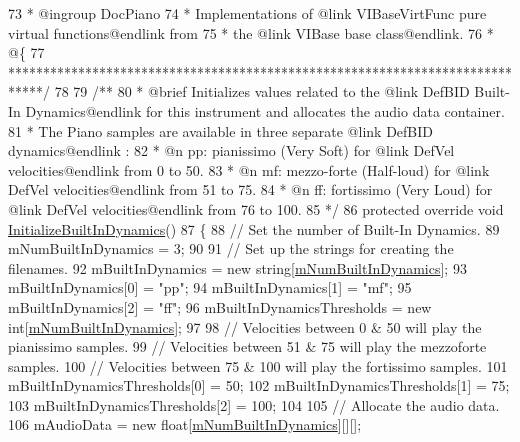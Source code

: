 \begin{DoxyCodeInclude}
73 \textcolor{comment}{     * @ingroup DocPiano}
74 \textcolor{comment}{     * Implementations of @link VIBaseVirtFunc pure virtual functions@endlink from}
75 \textcolor{comment}{     * the @link VIBase base class@endlink. }
76 \textcolor{comment}{     * @\{}
77 \textcolor{comment}{    *****************************************************************************/}
78 \textcolor{comment}{}
79 \textcolor{comment}{    /**}
80 \textcolor{comment}{     * @brief Initializes values related to the @link DefBID Built-In Dynamics@endlink for this instrument
       and allocates the audio data container.}
81 \textcolor{comment}{     * The Piano samples are available in three separate @link DefBID dynamics@endlink :}
82 \textcolor{comment}{     * @n pp: pianissimo (Very Soft) for @link DefVel velocities@endlink from 0 to 50.}
83 \textcolor{comment}{     * @n mf: mezzo-forte (Half-loud) for @link DefVel velocities@endlink from 51 to 75.}
84 \textcolor{comment}{     * @n ff: fortissimo (Very Loud) for @link DefVel velocities@endlink from 76 to 100.}
85 \textcolor{comment}{    */} 
86     \textcolor{keyword}{protected} \textcolor{keyword}{override} \textcolor{keywordtype}{void} \hyperlink{group___piano_virt_func_ga6bc02528f8808b8a30aa7d5776445a6d}{InitializeBuiltInDynamics}()
87     \{
88         \textcolor{comment}{// Set the number of Built-In Dynamics.}
89         mNumBuiltInDynamics = 3;
90 
91         \textcolor{comment}{// Set up the strings for creating the filenames.}
92         mBuiltInDynamics = \textcolor{keyword}{new} \textcolor{keywordtype}{string}[\hyperlink{group___v_i_base_pro_var_gac265f64f759d267ee1e1680f8d387011}{mNumBuiltInDynamics}];
93         mBuiltInDynamics[0] = \textcolor{stringliteral}{"pp"};
94         mBuiltInDynamics[1] = \textcolor{stringliteral}{"mf"};
95         mBuiltInDynamics[2] = \textcolor{stringliteral}{"ff"};
96         mBuiltInDynamicsThresholds = \textcolor{keyword}{new} \textcolor{keywordtype}{int}[\hyperlink{group___v_i_base_pro_var_gac265f64f759d267ee1e1680f8d387011}{mNumBuiltInDynamics}];
97 
98         \textcolor{comment}{// Velocities between 0 & 50 will play the pianissimo samples.}
99         \textcolor{comment}{// Velocities between 51 & 75 will play the mezzoforte samples.}
100         \textcolor{comment}{// Velocities between 75 & 100 will play the fortissimo samples.  }
101         mBuiltInDynamicsThresholds[0] = 50;
102         mBuiltInDynamicsThresholds[1] = 75;
103         mBuiltInDynamicsThresholds[2] = 100;
104 
105         \textcolor{comment}{// Allocate the audio data.}
106         mAudioData = \textcolor{keyword}{new} \textcolor{keywordtype}{float}[\hyperlink{group___v_i_base_pro_var_gac265f64f759d267ee1e1680f8d387011}{mNumBuiltInDynamics}][][];

\end{DoxyCodeInclude}
